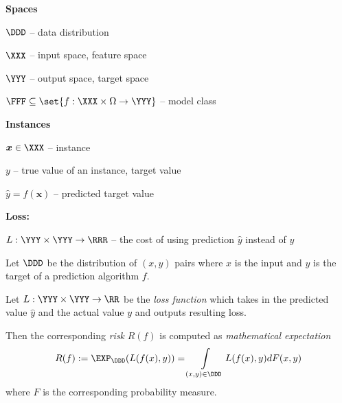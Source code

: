 \documentclass[landscape,footrule]{foils}
\renewcommand{\vec}[1]{\boldsymbol{#1}}
\begin{document}

\textbf{Spaces}
\begin{triangles}
\item $\DDD$ -- data distribution
\item $\XXX$ -- input space, feature space
\item $\YYY$ -- output space, target space
\item $\FFF\subseteq\set{f:\XXX\times\Omega\to\YYY}$ -- model class\vspace*{0.5cm}
\end{triangles}

\textbf{Instances}
\begin{triangles}
\item $\vec{x}\in\XXX$ -- instance
\item $y$ -- true value of an instance, target value
\item $\hat{y}=f(\vec{x})$ -- predicted target value\vspace*{0.5cm}
\end{triangles}

\textbf{Loss:}
\begin{triangles}
\item $L:\YYY\times\YYY\to\RRR$ --  the cost of using prediction $\hat{y}$ instead of $y$
\end{triangles}
 

 

Let $\DDD$ be the distribution of $(x,y)$ pairs where $x$ is the input and $y$ is the target of a prediction algorithm $f$. 
\bigskip

Let $L:\YYY\times\YYY\to\RR$ be the \emph{loss function} which takes in the predicted value $\hat{y}$ and the actual value $y$ and outputs resulting loss.
\bigskip

Then the corresponding \emph{risk} $R(f)$ is computed as \emph{mathematical expectation}
\begin{align*}
 R(f):=\EXP_\DDD(L(f(x), y))=\int\limits_{(x,y)\in\DDD} L(f(x), y) dF(x,y)
\end{align*}   
where $F$ is the corresponding probability measure.

\end{document}
